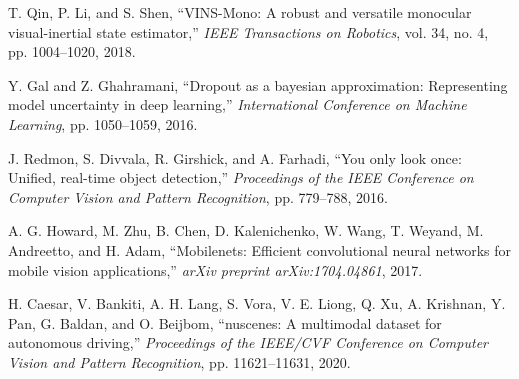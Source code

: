 \documentclass[10pt]{article}
\begin{document}
\begin{thebibliography}{99}
T. Qin, P. Li, and S. Shen,
``VINS-Mono: A robust and versatile monocular visual-inertial state estimator,''
\emph{IEEE Transactions on Robotics}, vol. 34, no. 4, pp. 1004--1020, 2018.

Y. Gal and Z. Ghahramani,
``Dropout as a bayesian approximation: Representing model uncertainty in deep learning,''
\emph{International Conference on Machine Learning}, pp. 1050--1059, 2016.

J. Redmon, S. Divvala, R. Girshick, and A. Farhadi,
``You only look once: Unified, real-time object detection,''
\emph{Proceedings of the IEEE Conference on Computer Vision and Pattern Recognition}, pp. 779--788, 2016.

A. G. Howard, M. Zhu, B. Chen, D. Kalenichenko, W. Wang, T. Weyand, M. Andreetto, and H. Adam,
``Mobilenets: Efficient convolutional neural networks for mobile vision applications,''
\emph{arXiv preprint arXiv:1704.04861}, 2017.

H. Caesar, V. Bankiti, A. H. Lang, S. Vora, V. E. Liong, Q. Xu, A. Krishnan, Y. Pan, G. Baldan, and O. Beijbom,
``nuscenes: A multimodal dataset for autonomous driving,''
\emph{Proceedings of the IEEE/CVF Conference on Computer Vision and Pattern Recognition}, pp. 11621--11631, 2020.

\end{thebibliography}
\end{document}
